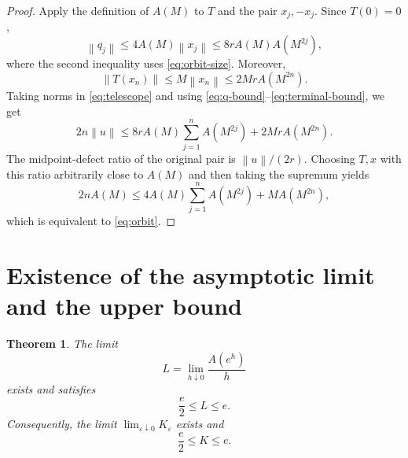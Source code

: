 \documentclass[11pt]{article}
\newtheorem{theorem}{Theorem}[section]
\theoremstyle{remark}
\newcommand{\eps}{\varepsilon}
\newcommand{\norm}[1]{\left\lVert #1\right\rVert}
\begin{document}
\begin{proof}
Apply the definition of $A(M)$ to $T$ and the pair $x_j,-x_j$.  Since
$T(0)=0$,
\begin{equation}\label{eq:q-bound}
 \norm{q_j}\le4A(M)\norm{x_j}
 \le8rA(M)A(M^{2j}),
\end{equation}
where the second inequality uses \eqref{eq:orbit-size}.  Moreover,
\begin{equation}\label{eq:terminal-bound}
 \norm{T(x_n)}\le M\norm{x_n}
 \le2MrA(M^{2n}).
\end{equation}
Taking norms in \eqref{eq:telescope} and using
\eqref{eq:q-bound}--\eqref{eq:terminal-bound}, we get
\[
 2n\norm{u}
 \le8rA(M)\sum_{j=1}^nA(M^{2j})
   +2MrA(M^{2n}).
\]
The midpoint-defect ratio of the original pair is $\norm{u}/(2r)$.
Choosing $T,x$ with this ratio arbitrarily close to $A(M)$ and then taking
the supremum yields
\[
 2nA(M)
 \le4A(M)\sum_{j=1}^nA(M^{2j})+MA(M^{2n}),
\]
which is equivalent to \eqref{eq:orbit}.
\end{proof}

\section{Existence of the asymptotic limit and the upper bound}

\begin{theorem}\label{thm:main}
The limit
\[
 L=\lim_{h\downarrow0}\frac{A(e^h)}h
\]
exists and satisfies
\[
 \frac e2\le L\le e.
\]
Consequently, the limit $\lim_{\eps\downarrow0}K_{\eps}$ exists and
\begin{equation}\label{eq:main-bound}
 \boxed{\frac e2\le K\le e}.
\end{equation}
\end{theorem}
\end{document}
